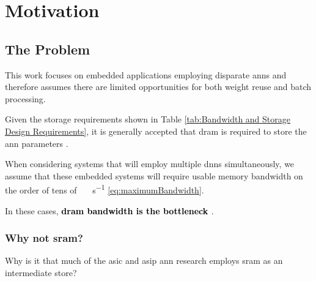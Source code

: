 



\section{Motivation}
\label{sec:Motivation}


\subsection[The Problem]{The Problem}
\label{sec:The Problem}

This work focuses on embedded applications employing disparate \ac{ann}s and therefore assumes there are limited opportunities for both weight reuse and batch processing.

Given the storage requirements shown in Table \ref{tab:Bandwidth and Storage Design Requirements}, it is generally accepted that \ac{dram} is required to store the \ac{ann} parameters \cite{azarkhish2017neurostream}\cite{dadiannao2014}\cite{dadiannao2017}.

When considering systems that will employ multiple \ac{dnn}s simultaneously, we assume that these embedded systems will require usable memory bandwidth on the order of tens of \SI[per-mode=symbol]{}{\tera \bit \per \second} \eqref{eq:maximumBandwidth}.

In these cases, \textbf{\textcolor{black}{\ac{dram} bandwidth is the bottleneck} \cite{dadiannao2017}}.

\iffalse
Given the bandwidth and storage requirements shown in Table \ref{tab:Bandwidth and Storage Design Requirements}, the problem becomes \hyphenquote{american}{\textbf{\textcolor{black}{to provide deterministic at or near real-time performance within tolerable power and space constraints for embedded systems employing inference on multiple disparate useful-sized neural networks.}}}
\fi


\subsubsection{Why not \ac{sram}?}
\label{sec:Why not SRAM}

Why is it that much of the \ac{asic} and \ac{asip} \ac{ann} research employs \ac{sram} as an intermediate store? 

